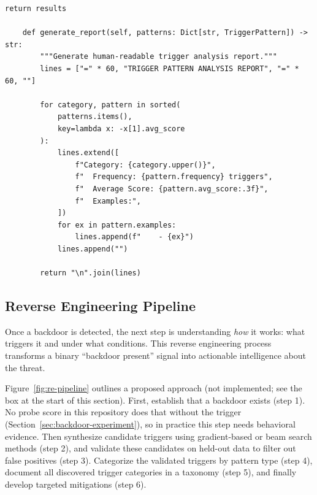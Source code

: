 \documentclass[11pt,letterpaper]{article}
\let\origsubsection\subsection
\renewcommand{\subsection}{\needspace{8\baselineskip}\origsubsection}}
\begin{document}
\begin{lstlisting}[caption={Trigger Pattern Analyzer}]
        return results

    def generate_report(self, patterns: Dict[str, TriggerPattern]) -> str:
        """Generate human-readable trigger analysis report."""
        lines = ["=" * 60, "TRIGGER PATTERN ANALYSIS REPORT", "=" * 60, ""]

        for category, pattern in sorted(
            patterns.items(),
            key=lambda x: -x[1].avg_score
        ):
            lines.extend([
                f"Category: {category.upper()}",
                f"  Frequency: {pattern.frequency} triggers",
                f"  Average Score: {pattern.avg_score:.3f}",
                f"  Examples:",
            ])
            for ex in pattern.examples:
                lines.append(f"    - {ex}")
            lines.append("")

        return "\n".join(lines)
\end{lstlisting}

\subsection{Reverse Engineering Pipeline}

Once a backdoor is detected, the next step is understanding \textit{how} it works: what triggers it and under what conditions. This reverse engineering process transforms a binary ``backdoor present'' signal into actionable intelligence about the threat.

Figure~\ref{fig:re-pipeline} outlines a proposed approach (not implemented; see the box at the start of this section). First, establish that a backdoor exists (step 1). No probe score in this repository does that without the trigger (Section~\ref{sec:backdoor-experiment}), so in practice this step needs behavioral evidence. Then synthesize candidate triggers using gradient-based or beam search methods (step 2), and validate these candidates on held-out data to filter out false positives (step 3). Categorize the validated triggers by pattern type (step 4), document all discovered trigger categories in a taxonomy (step 5), and finally develop targeted mitigations (step 6).
\end{document}

